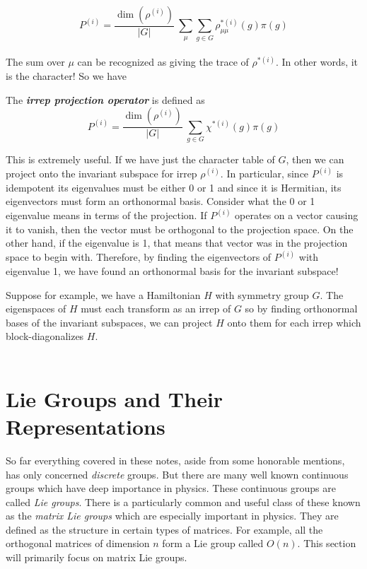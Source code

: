 \documentclass[9 pt]{report}
\begin{document}
$$ P^{(i)} = \frac{\dim(\rho^{(i)})}{|G|}\:\sum_\mu\sum_{g\in G}\rho^{*(i)}_{\mu\mu}(g)\pi(g) $$
\\
The sum over $\mu$ can be recognized as giving the trace of $\rho^{*(i)}$. In other words, it is the character! So we have

\begin{tcolorbox}
	The \textbf{\emph{irrep projection operator}} is defined as
	$$ P^{(i)} = \frac{\dim(\rho^{(i)})}{|G|}\:\sum_{g\in G}\chi^{*(i)}(g)\pi(g) $$
\end{tcolorbox}
This is extremely useful. If we have just the character table of $G$, then we can project onto the invariant subspace for irrep $\rho^{(i)}$. In particular, since $P^{(i)}$ is idempotent its eigenvalues must be either 0 or 1 and since it is Hermitian, its eigenvectors must form an orthonormal basis. Consider what the 0 or 1 eigenvalue means in terms of the projection. If $P^{(i)}$ operates on a vector causing it to vanish, then the vector must be orthogonal to the projection space. On the other hand, if the eigenvalue is 1, that means that vector was in the projection space to begin with. Therefore, by finding the eigenvectors of $P^{(i)}$ with eigenvalue 1, we have found an orthonormal basis for the invariant subspace!

Suppose for example, we have a Hamiltonian $H$ with symmetry group $G$. The eigenspaces of $H$ must each transform as an irrep of $G$ so by finding orthonormal bases of the invariant subspaces, we can project $H$ onto them for each irrep which block-diagonalizes $H$.
\\
\\


\newpage



\chapter*{Lie Groups and Their Representations}
So far everything covered in these notes, aside from some honorable mentions, has only concerned \emph{discrete} groups. But there are many well known continuous groups which have deep importance in physics. These continuous groups are called \emph{Lie groups}. There is a particularly common and useful class of these known as the \emph{matrix Lie groups} which are especially important in physics. They are defined as the structure in certain types of matrices. For example, all the orthogonal matrices of dimension $n$ form a Lie group called $O(n)$. This section will primarily focus on matrix Lie groups.
\end{document}
